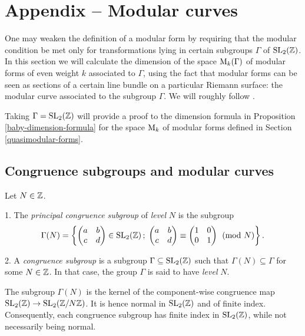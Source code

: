 \section{Appendix – Modular curves}

\newcommand{\jrm}{\mathrm{j}}

One may weaken the definition of a modular form by requiring that the modular condition be met only for transformations lying in certain subgroups $\Gamma$ of $\operatorname{SL}_2(\mathbb{Z})$. In this section we will calculate the dimension of the space $\mathrm{M}_k(\Gamma)$ of modular forms of even weight $k$ associated to $\Gamma$, using the fact that modular forms can be seen as sections of a certain line bundle on a particular Riemann surface: the modular curve associated to the subgroup $\Gamma$. We will roughly follow \cite[Ch.~1-3]{Diamond-Shurman}.

Taking $\Gamma=\operatorname{SL}_2(\mathbb{Z})$ will provide a proof to the dimension formula in Proposition \ref{baby-dimension-formula} for the space $\mathrm{M}_k$ of modular forms defined in Section \ref{quasimodular-forms}.

\subsection{Congruence subgroups and modular curves}

\begin{defi}
 Let $N\in \mathbb{Z}$.
 
 1. The \emph{principal congruence subgroup} of \emph{level} $N$ is the subgroup
 \[\Gamma(N)=\left\{\begin{pmatrix} a & b \\ c & d \end{pmatrix}\in\operatorname{SL}_2(\mathbb{Z})\,;\; \begin{pmatrix}a & b \\ c & d\end{pmatrix} \equiv \begin{pmatrix}1 & 0 \\ 0 & 1\end{pmatrix} \pmod{N}\right\}.\]
 
 2. A \emph{congruence subgroup} is a subgroup $\Gamma\subseteq\operatorname{SL}_2(\mathbb{Z})$ such that $\Gamma(N)\subseteq\Gamma$ for some $N\in\mathbb{Z}$. In that case, the group $\Gamma$ is said to have \emph{level} $N$. 
\end{defi}

\begin{rmk}
 The subgroup $\Gamma(N)$ is the kernel of the component-wise congruence map $\operatorname{SL}_2(\mathbb{Z})\to\operatorname{SL}_2(\mathbb{Z}/N\mathbb{Z})$. It is hence normal in $\operatorname{SL}_2(\mathbb{Z})$ and of finite index. Consequently, each congruence subgroup has finite index in $\operatorname{SL}_2(\mathbb{Z})$, while not  necessarily being normal.
\end{rmk}


